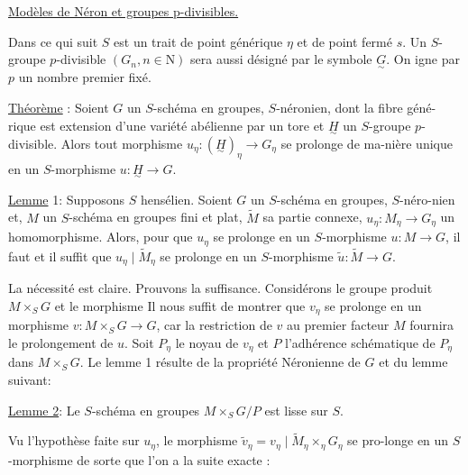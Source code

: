 \uline{Modèles de Néron et groupes p-divisibles.}

Dans ce qui suit $S$ est un trait de point générique $\eta$ et de point fermé $s$. Un $S$-groupe $p$-divisible $(G_n,n\in\mathrm N)$ sera aussi désigné par le symbole $\underset{\sim}{G}$. On igne par $p$ un nombre premier fixé.

\uline{Théorème} : Soient $G$ un $S$-schéma en groupes, $S$-néronien, \inserted{[}dont la fibre géné-rique est extension d'une variété abélienne par un tore\inserted{]} et $\underset{\sim}{H}$ un $S$-groupe $p$-divisible. Alors tout morphisme $u_\eta:(\underset{\sim}{H})_\eta\longrightarrow G_\eta$ se prolonge de ma-nière unique en un $S$-morphisme $u:\underset{\sim}{H}\longrightarrow G$.

\uline{Lemme} 1: Supposons $S$ hensélien. Soient $G$ un $S$-schéma en groupes, $S$-néro-nien et, $M$ un $S$-schéma en groupes fini et plat, $\widetilde M$ sa partie connexe,  $u_\eta:M_\eta\longrightarrow G_\eta$ un homomorphisme. Alors, pour que $u_\eta$ se prolonge en un $S$-morphisme $u:M\longrightarrow G$, il faut et il suffit que $u_\eta\mid\widetilde M_\eta$ se prolonge en un $S$-morphisme $\widetilde u:\widetilde M\longrightarrow G$.

La nécessité est claire. Prouvons la suffisance. Considérons le groupe produit $M\times_SG$ et le morphisme
Il nous suffit de montrer que $v_\eta$ se prolonge en un morphisme $v:M\times_SG\longrightarrow G$, car la restriction de $v$ au premier facteur $M$ fournira le prolongement de $u$. Soit $P_\eta$ le noyau de $v_\eta$ et $P$ l'adhérence schématique de $P_\eta$ dans $M\times_SG$. Le lemme 1 résulte de la propriété Néronienne de $G$ et du lemme suivant:

\uline{Lemme 2}: Le $S$-schéma en groupes $M\times_SG/P$  est lisse sur $S$.

Vu l'hypothèse faite sur $u_\eta$, le morphisme $\widetilde v_\eta=v_\eta\mid\widetilde M_\eta\times_\eta G_\eta$ se pro-longe en un $S$-morphisme
de sorte que l'on a la suite exacte :

